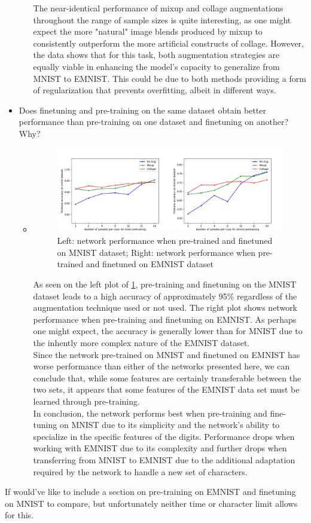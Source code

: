 \documentclass[english,11pt,a4paper,titlepage]{report}
\begin{document}
\begin{itemize}
\begin{itemize}
			The near-identical performance of mixup and collage augmentations throughout the range of sample sizes is quite interesting, as one might expect the more "natural" image blends produced by mixup to consistently outperform the more artificial constructs of collage. However, the data shows that for this task, both augmentation strategies are equally viable in enhancing the model's capacity to generalize from MNIST to EMNIST. This could be due to both methods providing a form of regularization that prevents overfitting, albeit in different ways.
			\newpage
		\end{itemize}
		\item Does finetuning and pre-training on the same dataset obtain better performance than pre-training on one dataset and finetuning on another? Why?
		\begin{itemize}
			\item \begin{figure}
				\centering
				\includegraphics[width=0.9\linewidth]{semisupervised_deep_learning/same_pretrain_finetune}
				\caption{Left: network performance when pre-trained and finetuned on MNIST dataset; Right: network performance when pre-trained and finetuned on EMNIST dataset}
				\label{fig:samepretrainfinetune}
			\end{figure}
			As seen on the left plot of \ref{fig:samepretrainfinetune}, pre-training and finetuning on the MNIST dataset leads to a high accuracy of approximately 95\% regardless of the augmentation technique used or not used. The right plot shows network performance when pre-training and finetuning on EMNIST. As perhaps one might expect, the accuracy is generally lower than for MNIST due to the inhently more complex nature of the EMNIST dataset.\\
			
			Since the network pre-trained on MNIST and finetuned on EMNIST has worse performance than either of the networks presented here, we can conclude that, while some features are certainly transferable between the two sets, it appears that some features of the EMNIST data set must be learned through pre-training.\\
			
			In conclusion, the network performs best when pre-training and fine-tuning on MNIST due to its simplicity and the network's ability to specialize in the specific features of the digits. Performance drops when working with EMNIST due to its complexity and further drops when transferring from MNIST to EMNIST due to the additional adaptation required by the network to handle a new set of characters.
		\end{itemize}
	\end{itemize}
	
	If would've like to include a section on pre-training on EMNIST and finetuning on MNIST to compare, but unfortunately neither time or character limit allows for this.
	
\end{document}
